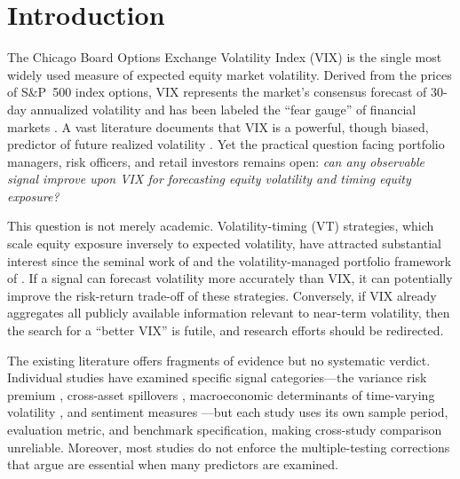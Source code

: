 \documentclass[12pt,a4paper]{article}
\begin{document}
\begin{abstract}
frequency. The informative null sharpens the research frontier: future gains require either higher-frequency realized measures or genuinely exogenous information not already embedded in option prices.

\medskip
\noindent
\textbf{Keywords:} VIX, volatility forecasting, volatility timing, out-of-sample evaluation, variance risk premium, multiple testing, option-implied volatility, drawdown insurance, proxy-robust loss, model confidence set, Value-at-Risk

\medskip
\noindent
\textbf{JEL Classification:} C53, G11, G12, G17
\end{abstract}

\newpage
\tableofcontents
\newpage

\section{Introduction}
\label{sec:intro}

The Chicago Board Options Exchange Volatility Index (VIX) is the single most widely used measure of expected equity market volatility. Derived from the prices of S\&P~500 index options, VIX represents the market's consensus forecast of 30-day annualized volatility and has been labeled the ``fear gauge'' of financial markets \citep{whaley2000}. A vast literature documents that VIX is a powerful, though biased, predictor of future realized volatility \citep{christensen1998, jiang2005, bekaert2014}. Yet the practical question facing portfolio managers, risk officers, and retail investors remains open: \emph{can any observable signal improve upon VIX for forecasting equity volatility and timing equity exposure?}

This question is not merely academic. Volatility-timing (VT) strategies, which scale equity exposure inversely to expected volatility, have attracted substantial interest since the seminal work of \citet{fleming2001} and the volatility-managed portfolio framework of \citet{moreira2017}. If a signal can forecast volatility more accurately than VIX, it can potentially improve the risk-return trade-off of these strategies. Conversely, if VIX already aggregates all publicly available information relevant to near-term volatility, then the search for a ``better VIX'' is futile, and research efforts should be redirected.

The existing literature offers fragments of evidence but no systematic verdict. Individual studies have examined specific signal categories---the variance risk premium \citep{bollerslev2009}, cross-asset spillovers \citep{diebold2012}, macroeconomic determinants of time-varying volatility \citep{schwert1989, engle2008}, and sentiment measures \citep{baker2006}---but each study uses its own sample period, evaluation metric, and benchmark specification, making cross-study comparison unreliable. Moreover, most studies do not enforce the multiple-testing corrections that \citet{harvey2016} argue are essential when many predictors are examined.
\end{document}
